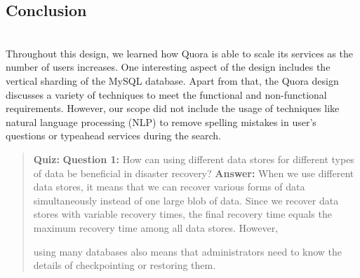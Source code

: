 \subsection{Conclusion}\label{dm2kXAxRbBkjgMdfq0MOE}
\\
Throughout this design, we learned how Quora is able to scale its services as the number of users increases. One interesting aspect of the design includes the vertical sharding of the MySQL database. Apart from that, the Quora design discusses a variety of techniques to meet the functional and non-functional requirements. However, our scope did not include the usage of techniques like natural language processing (NLP) to remove spelling mistakes in user's questions or typeahead services during the search.

\begin{quote}
\textbf{Quiz:}
\textbf{Question 1:} How can using different data stores for different types of data be beneficial in disaster recovery?
\textbf{Answer:} When we use different data stores, it means that we can recover various forms of data simultaneously instead of one large blob of data. Since we recover data stores with variable recovery times, the final recovery time equals the maximum recovery time among all data stores. However,

using many databases also means that administrators need to know the details of checkpointing or restoring them.
\end{quote}

